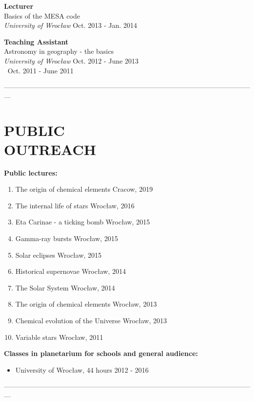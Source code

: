 \documentclass[margin, 10pt]{res} %
\begin{document}
\begin{resume}
{\bf Lecturer} \\
Basics of the MESA code \\
{\sl University of Wroc\l{}aw} \hfill Oct. 2013 - Jan. 2014

{\bf Teaching Assistant} \\
Astronomy in geography - the basics \\
{\sl University of Wroc\l{}aw} \hfill Oct. 2012 - June 2013 \\
$~$ \hfill Oct. 2011 - June 2011

---------------------------------------------------------------------------------------------------------------

\section{PUBLIC \\ OUTREACH}  

\textbf{Public lectures:}
\begin{enumerate}[noitemsep]
    \item The origin of chemical elements \hfill Cracow, 2019
    \item The internal life of stars \hfill  Wroc\l{}aw, 2016
    \item Eta Carinae - a ticking bomb \hfill Wroc\l{}aw, 2015
    \item Gamma-ray bursts \hfill Wroc\l{}aw, 2015
    \item Solar eclipses \hfill Wroc\l{}aw, 2015
    \item Historical supernovae \hfill Wroc\l{}aw, 2014
    \item The Solar System \hfill Wroc\l{}aw, 2014
    \item The origin of chemical elements \hfill Wroc\l{}aw, 2013
    \item Chemical evolution of the Universe \hfill Wroc\l{}aw, 2013
    \item Variable stars \hfill Wroc\l{}aw, 2011
\end{enumerate}

\textbf{Classes in planetarium for schools and general audience:}
\begin{itemize}[noitemsep]
    \item University of Wroc\l{}aw, 44 hours \hfill 2012 - 2016
\end{itemize}

---------------------------------------------------------------------------------------------------------------


\end{resume}
\end{document}
